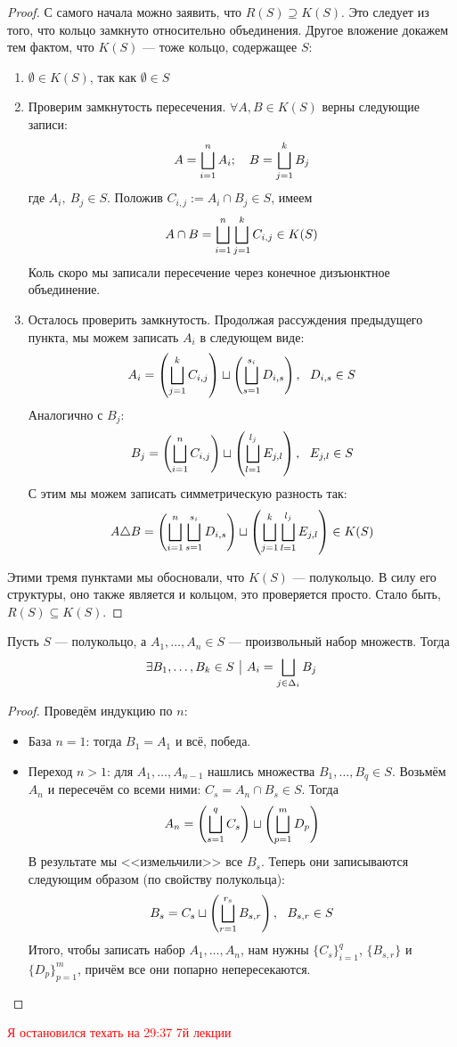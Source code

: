 \begin{proof}
	С самого начала можно заявить, что $R(S) \supseteq K(S)$. Это следует из того, что кольцо замкнуто относительно объединения. Другое вложение докажем тем фактом, что $K(S)$ --- тоже кольцо, содержащее $S$:
	\begin{enumerate}
		\item $\emptyset \in K(S)$, так как $\emptyset \in S$
		
		\item Проверим замкнутость пересечения. $\forall A, B \in K(S)$ верны следующие записи:
		\[
			A = \bigsqcup_{i = 1}^n A_i; \quad B = \bigsqcup_{j = 1}^k B_j
		\]
		где $A_i,\ B_j \in S$. Положив $C_{i, j} := A_i \cap B_j \in S$, имеем
		\[
			A \cap B = \bigsqcup_{i = 1}^n \bigsqcup_{j = 1}^k C_{i, j} \in K(S)
		\]
		Коль скоро мы записали пересечение через конечное дизъюнктное объединение.
		
		\item Осталось проверить замкнутость. Продолжая рассуждения предыдущего пункта, мы можем записать $A_i$ в следующем виде:
		\[
			A_i = \left(\bigsqcup_{j = 1}^k C_{i, j}\right) \sqcup \left(\bigsqcup_{s = 1}^{s_i} D_{i, s}\right),\ \ D_{i, s} \in S
		\]
		Аналогично с $B_j$:
		\[
			B_j = \left(\bigsqcup_{i = 1}^n C_{i, j}\right) \sqcup \left(\bigsqcup_{l = 1}^{l_j} E_{j, l}\right),\ \ E_{j, l} \in S
		\]
		С этим мы можем записать симметрическую разность так:
		\[
			A \triangle B = \left(\bigsqcup_{i = 1}^n \bigsqcup_{s = 1}^{s_i} D_{i, s}\right) \sqcup \left(\bigsqcup_{j = 1}^k \bigsqcup_{l = 1}^{l_j} E_{j, l}\right) \in K(S)
		\]
	\end{enumerate}
	Этими тремя пунктами мы обосновали, что $K(S)$ --- полукольцо. В силу его структуры, оно также является и кольцом, это проверяется просто. Стало быть, $R(S) \subseteq K(S)$.
\end{proof}

\begin{lemma}
	Пусть $S$ --- полукольцо, а $A_1, \ldots, A_n \in S$ --- произвольный набор множеств. Тогда
	\[
		\exists B_1, \ldots, B_k \in S \ \big|\  A_i = \bigsqcup_{j \in \Delta_i} B_j
	\]
\end{lemma}

\begin{proof}
	Проведём индукцию по $n$:
	\begin{itemize}
		\item База $n = 1$: тогда $B_1 = A_1$ и всё, победа.
		
		\item Переход $n > 1$: для $A_1, \ldots, A_{n - 1}$ нашлись множества $B_1, \ldots, B_q \in S$. Возьмём $A_n$ и пересечём со всеми ними: $C_s = A_n \cap B_s \in S$. Тогда
		\[
			A_n = \left(\bigsqcup_{s = 1}^q C_s\right) \sqcup \left(\bigsqcup_{p = 1}^m D_p\right)
		\]
		В результате мы <<измельчили>> все $B_s$. Теперь они записываются следующим образом (по свойству полукольца):
		\[
			B_s = C_s \sqcup \left(\bigsqcup_{r = 1}^{r_s} B_{s, r}\right),\ \ B_{s, r} \in S
		\]
		Итого, чтобы записать набор $A_1, \ldots, A_n$, нам нужны $\{C_s\}_{i = 1}^q$, $\{B_{s, r}\}$ и $\{D_p\}_{p = 1}^m$, причём все они попарно непересекаются.
	\end{itemize}
\end{proof}

\textcolor{red}{Я остановился техать на 29:37 7й лекции}